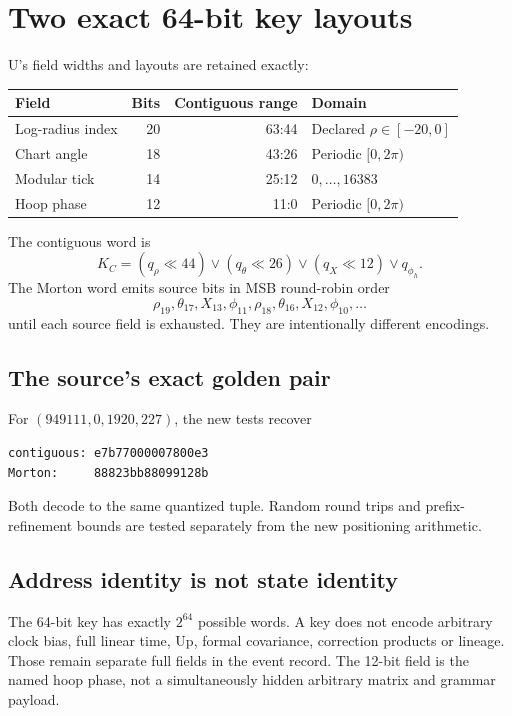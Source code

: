 \section{Two exact 64-bit key layouts}
U's field widths and layouts are retained exactly:
\begin{center}
\begin{tabular}{@{}lrrl@{}}\toprule
\textbf{Field} & \textbf{Bits} & \textbf{Contiguous range} & \textbf{Domain}\\\midrule
Log-radius index &20&63:44&Declared $\rho\in[-20,0]$\\
Chart angle &18&43:26&Periodic $[0,2\pi)$\\
Modular tick &14&25:12&$0,\ldots,16383$\\
Hoop phase &12&11:0&Periodic $[0,2\pi)$\\\bottomrule
\end{tabular}
\end{center}
The contiguous word is
\begin{equation}
K_C=(q_\rho\ll44)\lor(q_\theta\ll26)\lor(q_X\ll12)\lor q_{\phi_h}.
\end{equation}
The Morton word emits source bits in MSB round-robin order
\begin{equation}
\rho_{19},\theta_{17},X_{13},\phi_{11},\rho_{18},\theta_{16},X_{12},\phi_{10},\ldots
\end{equation}
until each source field is exhausted. They are intentionally different encodings.

\subsection{The source's exact golden pair}
For $(949111,0,1920,227)$, the new tests recover
\begin{lstlisting}
contiguous: e7b77000007800e3
Morton:     88823bb88099128b
\end{lstlisting}
Both decode to the same quantized tuple. Random round trips and prefix-refinement
bounds are tested separately from the new positioning arithmetic.

\subsection{Address identity is not state identity}
The 64-bit key has exactly $2^{64}$ possible words. A key does not encode arbitrary
clock bias, full linear time, Up, formal covariance, correction products or lineage.
Those remain separate full fields in the event record. The 12-bit field is the named
hoop phase, not a simultaneously hidden arbitrary matrix and grammar payload.


